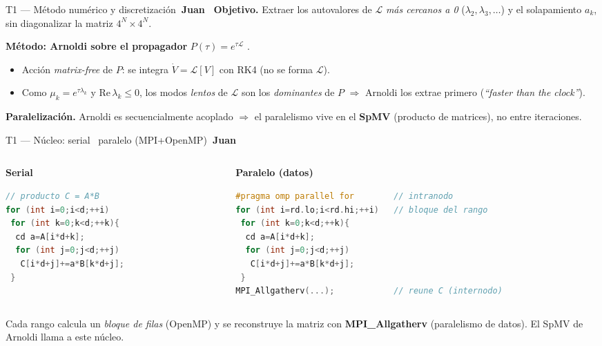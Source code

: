 \documentclass[aspectratio=169,10pt]{beamer}
\newcommand{\J}{\hfill\colorbox{juan}{\color{white}\scriptsize\bfseries~Juan~}}
\newcommand{\cs}[1]{\textcolor{seb}{\textbf{#1}}}
\newcommand{\Lop}{\mathcal{L}}
\begin{document}
\begin{frame}{T1 — Método numérico y discretización\J}
  \small
  \textbf{Objetivo.} Extraer los autovalores de $\Lop$ \emph{más cercanos a 0}
  ($\lambda_2,\lambda_3,\dots$) y el solapamiento $a_k$, sin diagonalizar la matriz
  $4^N\times4^N$.
  \medskip

  \textbf{Método: Arnoldi sobre el propagador} $P(\tau)=e^{\tau\Lop}$
  \cite{Minganti2018,Lehoucq1998}.
  \begin{itemize}
    \item Acción \emph{matrix-free} de $P$: se integra $\dot V=\Lop[V]$ con RK4
      (no se forma $\Lop$).
    \item Como $\mu_k=e^{\tau\lambda_k}$ y $\mathrm{Re}\,\lambda_k\le0$, los modos
      \emph{lentos} de $\Lop$ son los \emph{dominantes} de $P$ $\Rightarrow$ Arnoldi
      los extrae primero (\emph{``faster than the clock''}).
  \end{itemize}
  \medskip
  \textbf{Paralelización.} Arnoldi es secuencialmente acoplado $\Rightarrow$ el
  paralelismo vive en el \cs{SpMV} (producto de matrices), no entre iteraciones.
\end{frame}

\begin{frame}[fragile]{T1 — Núcleo: serial \textbar\ paralelo (MPI+OpenMP)\J}
  \begin{columns}[T]
  \begin{column}{0.48\textwidth}
  \centering\textbf{\small Serial}
\begin{lstlisting}[language=C++]
// producto C = A*B
for (int i=0;i<d;++i)
 for (int k=0;k<d;++k){
  cd a=A[i*d+k];
  for (int j=0;j<d;++j)
   C[i*d+j]+=a*B[k*d+j];
 }
\end{lstlisting}
  \end{column}
  \begin{column}{0.52\textwidth}
  \centering\textbf{\small Paralelo (datos)}
\begin{lstlisting}[language=C++]
#pragma omp parallel for        // intranodo
for (int i=rd.lo;i<rd.hi;++i)   // bloque del rango
 for (int k=0;k<d;++k){
  cd a=A[i*d+k];
  for (int j=0;j<d;++j)
   C[i*d+j]+=a*B[k*d+j];
 }
MPI_Allgatherv(...);            // reune C (internodo)
\end{lstlisting}
  \end{column}
  \end{columns}
  \vfill
  {\small Cada rango calcula un \emph{bloque de filas} (OpenMP) y se reconstruye la
  matriz con \cs{MPI\_Allgatherv} (paralelismo de datos). El SpMV de Arnoldi llama a
  este núcleo.}
\end{frame}
\end{document}
